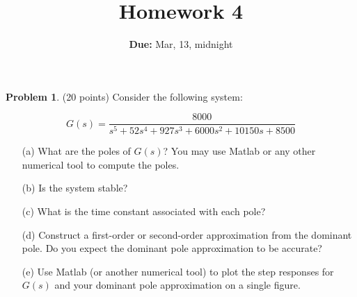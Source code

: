 \documentclass{article}
\theoremstyle{definition}
\newtheorem{problem}{Problem}
\begin{document}
\title{Homework 4}
\author{{\bf Due:} Mar, 13, midnight}
\date{}
\maketitle


\begin{problem} (20 points) Consider the following system:

\[
G(s) = \frac{8000}{s^5 + 52s^4 + 927s^3 + 6000s^2 + 10150s + 8500}
\]

\begin{enumerate}
    \item[(a)] What are the poles of \( G(s) \)? You may use Matlab or any other numerical tool to compute the poles.
    \item[(b)] Is the system stable?
    \item[(c)] What is the time constant associated with each pole?
    \item[(d)] Construct a first-order or second-order approximation from the dominant pole. Do you expect the dominant pole approximation to be accurate?
    \item[(e)] Use Matlab (or another numerical tool) to plot the step responses for \( G(s) \) and your dominant pole approximation on a single figure.
\end{enumerate}

\end{problem}
\end{document}
